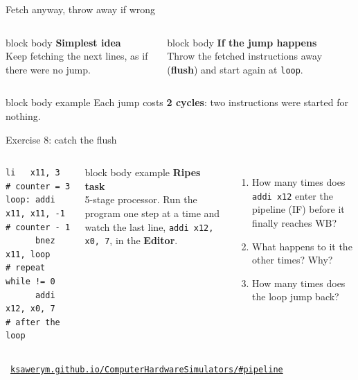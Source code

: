 \documentclass[aspectratio=169,10pt]{beamer}
\newcommand{\stepbox}[2]{%
  \begin{beamercolorbox}[rounded=true,sep=0.09cm,wd=\linewidth]{block body}
    \footnotesize\textbf{#1}\\ #2
  \end{beamercolorbox}\vspace{0.06cm}}
\newcommand{\taskhead}[2]{%
  \begin{beamercolorbox}[rounded=true,sep=0.12cm,wd=\linewidth]{block body example}
    \small\textbf{#1}\\[0.04cm]
    \footnotesize #2
  \end{beamercolorbox}\vspace{0.1cm}}
\newcommand{\keymsg}[1]{%
  \begin{beamercolorbox}[rounded=true,sep=0.1cm,wd=\textwidth]{block body example}
    \centering\footnotesize #1
  \end{beamercolorbox}}
\def\pw{0.74}
\def\ph{0.46}
\newcommand{\prow}[3]{%
  \foreach \s [count=\k from 0] in {#3} {%
    \node[pst-\s] at ({(#2+\k-1)*\pw}, {-(#1)*\ph}) {%
      \expandafter\ifstrequal\expandafter{\s}{B}{bubble}{%
      \expandafter\ifstrequal\expandafter{\s}{X}{$\times$}{%
      \expandafter\ifstrequal\expandafter{\s}{N}{}{\expandafter\ifstrequal\expandafter{\s}{E}{}{\s}}}}};
  }}
\newcommand{\plabel}[2]{\node[plab] at ({-0.5*\pw-0.05}, {-(#1)*\ph}) {#2};}
\newcommand{\pcycles}[1]{%
  \foreach \c in {1,...,#1}
    \node[font=\scriptsize, text=DeepBlue!70] at ({(\c-1)*\pw}, {0.8*\ph}) {\c};
  \node[font=\scriptsize, text=DeepBlue!70, anchor=east] at ({-0.5*\pw-0.05}, {0.8*\ph}) {cycle};}
\newcommand{\simbase}{https://ksawerym.github.io/ComputerHardwareSimulators/}
\newcommand{\simlink}[1]{\href{\simbase\##1}{\texttt{ksawerym.github.io/ComputerHardwareSimulators/\##1}}}
\newcommand{\simfoot}[1]{\par\vfill{\hfill\scriptsize\textcolor{gray}{\faLink\ #1}\par}}
\begin{document}
\begin{frame}{Fetch anyway, throw away if wrong}
  \begin{columns}[c,onlytextwidth]
      \centering
      \stepbox{Simplest idea}{Keep fetching the next lines, as if there were no jump.}
      \stepbox{If the jump happens}{Throw the fetched instructions away (\textbf{flush}) and start again at \texttt{loop}.}
  \end{columns}
  \vfill
  \keymsg{Each jump costs \textbf{2 cycles}: two instructions were started for nothing.}
\end{frame}

\begin{frame}[fragile]{Exercise 8: catch the flush}
  \begin{columns}[T,onlytextwidth]
\begin{lstlisting}[style=rv]
      li   x11, 3          # counter = 3
loop: addi x11, x11, -1    # counter - 1
      bnez x11, loop       # repeat while != 0
      addi x12, x0, 7      # after the loop
\end{lstlisting}
      \taskhead{Ripes task}{5-stage processor. Run the program one step at a time and watch
        the last line, \texttt{addi x12, x0, 7}, in the \textbf{Editor}.}
      \footnotesize
      \begin{enumerate}\setlength{\itemsep}{4pt}
        \item How many times does \texttt{addi x12} enter the pipeline (IF) before it finally reaches WB?
        \item What happens to it the other times? Why?
        \item How many times does the loop jump back?
      \end{enumerate}
  \end{columns}
  \simfoot{\simlink{pipeline}}
\end{frame}
\end{document}
